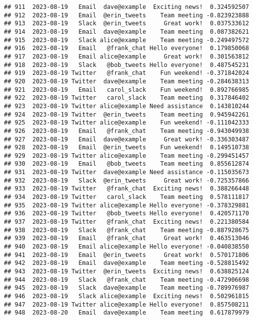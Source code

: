 \documentclass[
]{article}
\begin{document}
\begin{verbatim}
## 911  2023-08-19   Email  dave@example  Exciting news!  0.324592507
## 912  2023-08-19   Email  @erin_tweets    Team meeting -0.823923888
## 913  2023-08-19   Slack  @erin_tweets     Great work!  0.037533612
## 914  2023-08-19   Email  dave@example    Team meeting  0.087382621
## 915  2023-08-19   Slack alice@example    Team meeting -0.249497572
## 916  2023-08-19   Email   @frank_chat Hello everyone!  0.179850068
## 917  2023-08-19   Email alice@example     Great work!  0.301563812
## 918  2023-08-19   Slack   @bob_tweets Hello everyone!  0.487545231
## 919  2023-08-19 Twitter   @frank_chat    Fun weekend! -0.371842024
## 920  2023-08-19 Twitter  dave@example    Team meeting -0.284638313
## 921  2023-08-19   Email   carol_slack    Fun weekend!  0.892766985
## 922  2023-08-19 Twitter   carol_slack    Team meeting  0.317846402
## 923  2023-08-19 Twitter alice@example Need assistance  0.143810244
## 924  2023-08-19 Twitter  @erin_tweets    Team meeting  0.945942261
## 925  2023-08-19 Twitter alice@example    Fun weekend! -0.111042333
## 926  2023-08-19   Email   @frank_chat    Team meeting -0.943049938
## 927  2023-08-19   Email  dave@example     Great work! -0.336303487
## 928  2023-08-19   Email  @erin_tweets    Fun weekend!  0.149510738
## 929  2023-08-19 Twitter alice@example    Team meeting -0.299451457
## 930  2023-08-19   Email   @bob_tweets    Team meeting  0.855612874
## 931  2023-08-19 Twitter  dave@example Need assistance -0.115035673
## 932  2023-08-19   Slack  @erin_tweets     Great work! -0.725357866
## 933  2023-08-19 Twitter   @frank_chat  Exciting news!  0.388266448
## 934  2023-08-19 Twitter   carol_slack    Team meeting  0.578111817
## 935  2023-08-19 Twitter alice@example Hello everyone! -0.378329881
## 936  2023-08-19 Twitter   @bob_tweets Hello everyone!  0.420571170
## 937  2023-08-19 Twitter   @frank_chat  Exciting news!  0.221380584
## 938  2023-08-19   Slack   @frank_chat    Team meeting -0.887928675
## 939  2023-08-19   Email   @frank_chat     Great work!  0.463513046
## 940  2023-08-19   Email alice@example Hello everyone! -0.040838550
## 941  2023-08-19   Email  @erin_tweets     Great work!  0.570171806
## 942  2023-08-19   Email  dave@example    Team meeting -0.528815492
## 943  2023-08-19 Twitter  @erin_tweets  Exciting news!  0.638825124
## 944  2023-08-19   Slack   @frank_chat    Team meeting -0.472906698
## 945  2023-08-19   Slack  dave@example    Team meeting -0.789976987
## 946  2023-08-19   Slack alice@example  Exciting news!  0.502961815
## 947  2023-08-19 Twitter alice@example Hello everyone!  0.857508211
## 948  2023-08-20   Email  dave@example    Team meeting  0.617879979

\end{verbatim}
\end{document}
